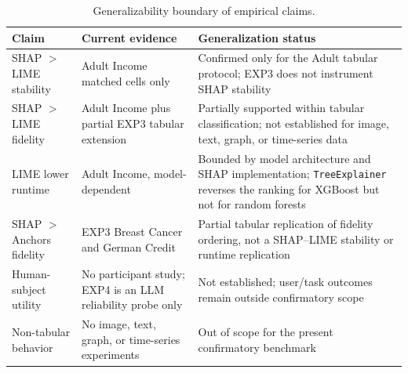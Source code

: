 \documentclass[10pt]{article}
\begin{document}
\begin{table}[t]
\centering
\caption{Generalizability boundary of empirical claims.}
\label{tab:generalizability_boundary}
\begin{tabularx}{\linewidth}{l X X}
\toprule
\textbf{Claim} & \textbf{Current evidence} & \textbf{Generalization status} \\
\midrule
SHAP $>$ LIME stability & Adult Income matched cells only & Confirmed only for the Adult tabular protocol; EXP3 does not instrument SHAP stability \\
SHAP $>$ LIME fidelity & Adult Income plus partial EXP3 tabular extension & Partially supported within tabular classification; not established for image, text, graph, or time-series data \\
LIME lower runtime & Adult Income, model-dependent & Bounded by model architecture and SHAP implementation; \texttt{TreeExplainer} reverses the ranking for XGBoost but not for random forests \\
SHAP $>$ Anchors fidelity & EXP3 Breast Cancer and German Credit & Partial tabular replication of fidelity ordering, not a SHAP--LIME stability or runtime replication \\
Human-subject utility & No participant study; EXP4 is an LLM reliability probe only & Not established; user/task outcomes remain outside confirmatory scope \\
Non-tabular behavior & No image, text, graph, or time-series experiments & Out of scope for the present confirmatory benchmark \\
\bottomrule
\end{tabularx}
\end{table}
\end{document}
